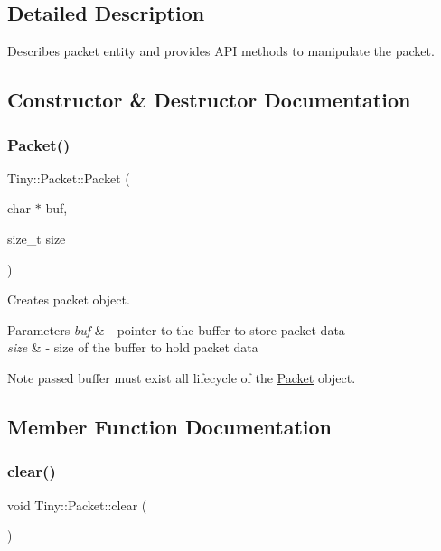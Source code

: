 \subsection{Detailed Description}
Describes packet entity and provides A\+PI methods to manipulate the packet. 

\subsection{Constructor \& Destructor Documentation}
\mbox{\label{classTiny_1_1Packet_aad47b3053945b29b1b46d76b31b72960}} 
\subsubsection{\texorpdfstring{Packet()}{Packet()}}
{\footnotesize\ttfamily Tiny\+::\+Packet\+::\+Packet (\begin{DoxyParamCaption}\item[{char $\ast$}]{buf,  }\item[{size\+\_\+t}]{size }\end{DoxyParamCaption})\hspace{0.3cm}{\ttfamily [inline]}}

Creates packet object. 
\begin{DoxyParams}{Parameters}
{\em buf} & -\/ pointer to the buffer to store packet data \\
\hline
{\em size} & -\/ size of the buffer to hold packet data \\
\hline
\end{DoxyParams}
\begin{DoxyNote}{Note}
passed buffer must exist all lifecycle of the \hyperlink{classTiny_1_1Packet}{Packet} object. 
\end{DoxyNote}


\subsection{Member Function Documentation}
\mbox{\label{classTiny_1_1Packet_a9bfdb9244515ef3dbf1056c1e37d0902}} 
\subsubsection{\texorpdfstring{clear()}{clear()}}
{\footnotesize\ttfamily void Tiny\+::\+Packet\+::clear (\begin{DoxyParamCaption}{ }\end{DoxyParamCaption})\hspace{0.3cm}{\ttfamily [inline]}}

